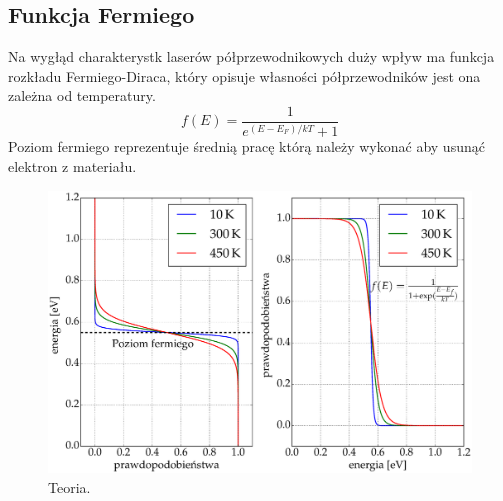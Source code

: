 \subsection{Funkcja Fermiego}
Na wygłąd charakterystk laserów półprzewodnikowych duży wpływ ma funkcja rozkładu Fermiego-Diraca, który opisuje
własności półprzewodników jest ona zależna od temperatury.
\begin{equation}
f(E) = \frac{1}{e^{(E-E_F)/kT} + 1}
\end{equation}
Poziom fermiego reprezentuje średnią pracę którą należy wykonać aby usunąć elektron z materiału.
\begin{figure}
\center
  \includegraphics[scale=0.30]{fermi.eps}
  \caption{Teoria.}
  \label{teoria_rys_1}
\end{figure}

\newpage